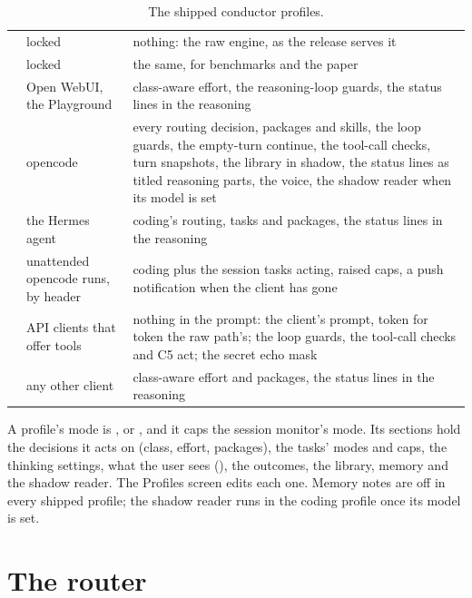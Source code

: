 \begin{table}[htbp]
\centering\small
\caption{The shipped conductor profiles.}\label{tab:profiles}
\begin{tabularx}{\linewidth}{@{}L{.13\linewidth}L{.24\linewidth}Y@{}}
\toprule
{} &  &  \\
\midrule
{} & locked & nothing: the raw engine, as the release serves it \\
 & locked & the same, for benchmarks and the paper \\
 & Open WebUI, the Playground & class-aware effort, the reasoning-loop guards, the status lines in the reasoning \\
 & opencode & every routing decision, packages and skills, the loop guards, the empty-turn continue, the tool-call checks, turn snapshots, the library in shadow, the status lines as titled reasoning parts, the voice, the shadow reader when its model is set \\
 & the Hermes agent & coding's routing, tasks and packages, the status lines in the reasoning \\
 & unattended opencode runs, by header & coding plus the session tasks acting, raised caps, a push notification when the client has gone \\
 & API clients that offer tools & nothing in the prompt: the client's prompt, token for token the raw path's; the loop guards, the tool-call checks and C5 act; the secret echo mask \\
 & any other client & class-aware effort and packages, the status lines in the reasoning \\
\bottomrule
\end{tabularx}
\end{table}

A profile's mode is ,  or , and it caps the session monitor's mode. Its sections hold the decisions it acts on (class, effort, packages), the tasks' modes and caps, the thinking settings, what the user sees (), the outcomes, the library, memory and the shadow reader. The Profiles screen edits each one. Memory notes are off in every shipped profile; the shadow reader runs in the coding profile once its model is set.

\section{The router}\label{sec:router}

